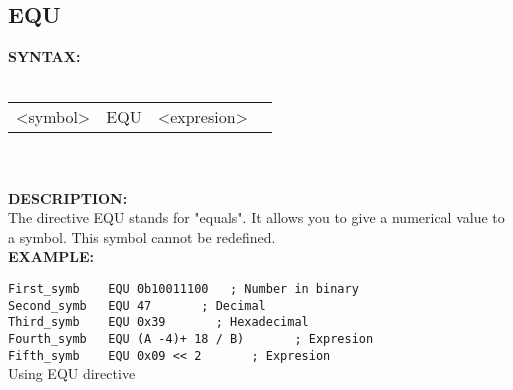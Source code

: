                 \subsection{EQU}
                \textbf{SYNTAX:}\\
                        \\ {
                            \texttt{}
                            \begin{tabular}[h!]{llll}
                                    { \color{highlight_symbol} <symbol> }  &
                                    { \color{highlight_directive} EQU } &
                                    { \color{highlight_constant} <expresion> } & { \color{highlight_comment}  }\\
                            \end{tabular}
                        }\\
                        \\
                \textbf{DESCRIPTION:}\\
                The directive EQU stands for "equals". It allows you to give a numerical value to a symbol. This symbol cannot be redefined.
                \\
                \textbf{EXAMPLE:}\\
                        \begin{code}[h!]
                                {\color{highlight_constant}\verb'First_symb'}\verb'    '{\color{highlight_directive}\verb'EQU'}\verb' '{\color{highlight_bin}\verb'0b10011100'}\verb'   '{\color{highlight_comment}\verb'; Number in binary'}\\
                                {\color{highlight_constant}\verb'Second_symb'}\verb'   '{\color{highlight_directive}\verb'EQU'}\verb' '{\color{highlight_oct}\verb'47'}\verb'       '{\color{highlight_comment}\verb'; Decimal'}\\
                                {\color{highlight_constant}\verb'Third_symb'}\verb'    '{\color{highlight_directive}\verb'EQU'}\verb' '{\color{highlight_dec}\verb'0x39'}\verb'       '{\color{highlight_comment}\verb'; Hexadecimal'}\\
                                {\color{highlight_constant}\verb'Fourth_symb'}\verb'   '{\color{highlight_directive}\verb'EQU'}\verb' '{\color{highlight_dec}\verb'(A -4)+ 18 / B)'}\verb'       '{\color{highlight_comment}\verb'; Expresion'}\\
                                {\color{highlight_constant}\verb'Fifth_symb'}\verb'    '{\color{highlight_directive}\verb'EQU'}\verb' '{\color{highlight_dec}\verb'0x09 << 2'}\verb'       '{\color{highlight_comment}\verb'; Expresion'}\\
                        \caption{Using EQU directive}
                    \end{code}

